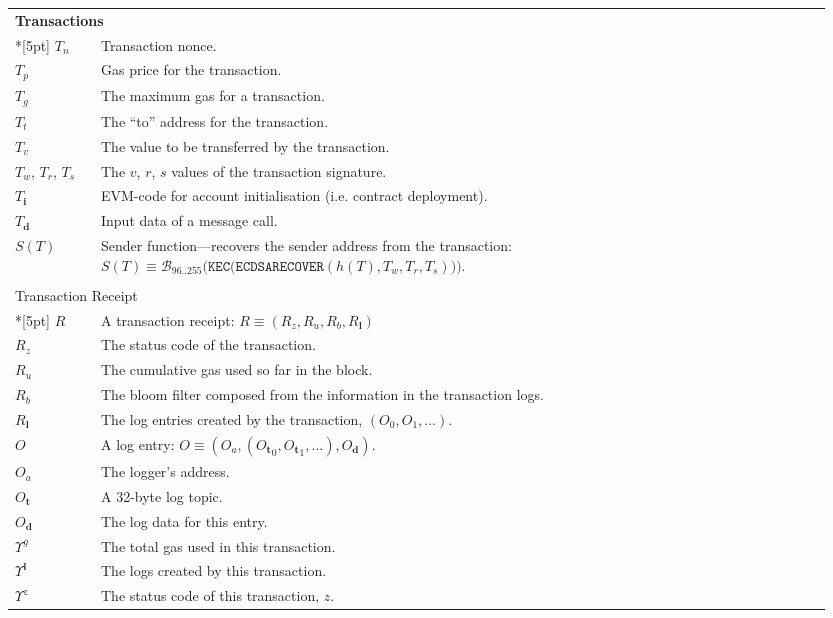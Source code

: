 \documentclass[9pt,oneside]{amsart}
\begin{document}
\begin{longtable}{p{0.10\linewidth}p{0.85\linewidth}}
\vspace{5pt} \\
\midrule
\multicolumn{2}{l}{\textbf{Transactions}} \\*[5pt]
$T_n$ & Transaction nonce. \\
$T_p$ & Gas price for the transaction. \\
$T_g$ & The maximum gas for a transaction. \\
$T_t$ & The ``to'' address for the transaction. \\
$T_v$ & The value to be transferred by the transaction. \\
$T_w$, $T_r$, $T_s$ & The $v$, $r$, $s$ values of the transaction signature. \\
$T_\mathbf{i}$ & EVM-code for account initialisation (i.e. contract deployment). \\
$T_\mathbf{d}$ & Input data of a message call. \\
$S(T)$ & Sender function---recovers the sender address from the transaction: \newline $S(T) \equiv \mathcal{B}_{96..255}\big(\mathtt{KEC}\big( \mathtt{ECDSARECOVER}(h(T), T_w, T_r, T_s) \big) \big).$ \\

\vspace{5pt} \\
\multicolumn{2}{l}{Transaction Receipt} \\*[5pt]
$R$ & A transaction receipt: $R \equiv (R_z, R_u, R_b, R_\mathbf{l})$ \\
$R_z$ & The status code of the transaction. \\
$R_u$ & The cumulative gas used so far in the block. \\
$R_b$ & The bloom filter composed from the information in the transaction logs. \\
$R_\mathbf{l}$ & The log entries created by the transaction, $(O_0, O_1, ...)$. \\
$O$ & A log entry: $O \equiv (O_a, ({O_\mathbf{t}}_0, {O_\mathbf{t}}_1, ...), O_\mathbf{d})$. \\
$O_a$ & The logger's address. \\
$O_\mathbf{t}$ & A 32-byte log topic. \\
$O_\mathbf{d}$ & The log data for this entry. \\

$\Upsilon^g$ & The total gas used in this transaction. \\
$\Upsilon^\mathbf{l}$ & The logs created by this transaction. \\
$\Upsilon^z$ & The status code of this transaction, $z$. \\


\end{longtable}
\end{document}
